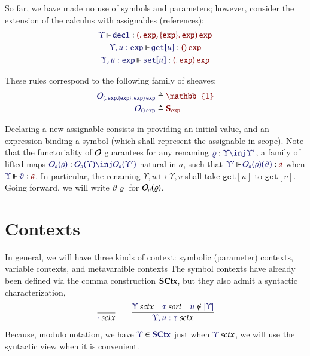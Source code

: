 \documentclass[11pt]{article}
\theoremstyle{definition}
\theoremstyle{remark}
\numberwithin{equation}{section}
\newcommand\SortExp{\mathtt{exp}}
\begin{document}
So far, we have made no use of symbols and parameters; however, consider the
extension of the calculus with assignables (references):
%
\begin{gather*}
  \IsOperator{\Upsilon}{\mathtt{decl}}{
    \MkArity{
      \MkValence{}{}{\SortExp},
      \MkValence{\SortExp}{}{\SortExp}
    }{
      \SortExp
    }
  }
\\
  \IsOperator{\Upsilon,u:\SortExp}{\mathtt{get}[u]}{
    \MkArity{}{\SortExp}
  }
\\
  \IsOperator{\Upsilon,u:\SortExp}{\mathtt{set}[u]}{
    \MkArity{
      \MkValence{}{}{\SortExp}
    }{
      \SortExp
    }
  }
\end{gather*}

These rules correspond to the following family of sheaves:
\begin{align*}
  \ADefine{
    \Operators_{
      \MkArity{
        \MkValence{}{}{\SortExp},
        \MkValence{\SortExp}{}{\SortExp}
      }{
        \SortExp
      }
    }
  }{
    \mathbb{1}
  }\\
  \ADefine{
    \Operators_{
      \MkArity{}{\SortExp}
    }
  }{
    \mathbf{S}_\SortExp
  }
\end{align*}

Declaring a new assignable consists in providing an initial value, and an
expression binding a symbol (which shall represent the assignable in scope).
Note that the functoriality of $\mathcal{O}$ guarantees for any renaming
$\Of{\varrho}{\Upsilon\inj\Upsilon'}$, a family of lifted maps
$\Of{\Operators_a(\varrho)}{\Operators_a(\Upsilon)\inj\Operators_a(\Upsilon')}$
natural in $a$, such that
$\IsOperator{\Upsilon'}{\Operators_a(\varrho)(\vartheta)}{a}$ when
$\IsOperator{\Upsilon}{\vartheta}{a}$. In particular, the renaming
$\Upsilon,u\mapsto\Upsilon,v$ shall take $\mathtt{get}[u]$ to
$\mathtt{get}[v]$. Going forward, we will write $\vartheta\varrho$ for
$\mathcal{O}_a(\varrho)$.


\section{Contexts}

In general, we will have three kinds of context: symbolic (parameter) contexts,
variable contexts, and metavaraible contexts The symbol contexts have already
been defined via the comma construction $\mathbf{SCtx}$, but they also admit a
syntactic characterization,
\begin{gather*}
  \infer{
    \IsSymCtx{\cdot}
  }{
  }
\qquad
  \infer{
    \IsSymCtx{\Upsilon,u:\tau}
  }{
    \IsSymCtx{\Upsilon}
&
    \IsSort{\tau}
&
    \NotIn{u}{\Dom\Upsilon}
  }
\end{gather*}
%
Because, modulo notation, we have $\Member{\Upsilon}{\SCtx}$ just when
$\IsSymCtx{\Upsilon}$, we will use the syntactic view when it is convenient.
\end{document}
